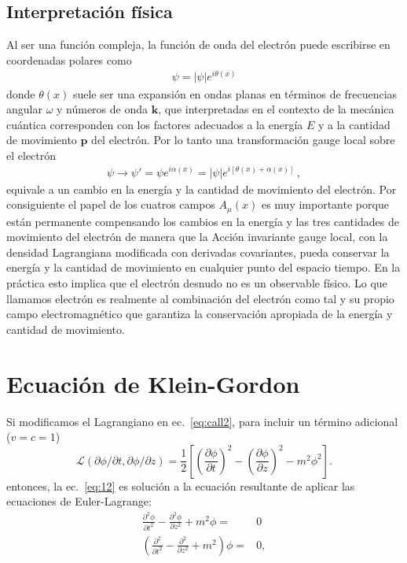 \subsection{Interpretación física}
Al ser una función compleja, la función de onda del electrón puede escribirse en coordenadas polares como
\begin{align}
  \psi=|\psi|e^{i\theta(x)}
\end{align}
donde $\theta(x)$ suele ser una expansión en ondas planas en términos de frecuencias angular $\omega$ y números de onda $\mathbf{k}$, que interpretadas en el contexto de la mecánica cuántica corresponden con los factores adecuados a la energía $E$ y a la cantidad de movimiento $\mathbf{p}$ del electrón. Por lo tanto una transformación gauge local sobre el electrón
\begin{align}
  \psi\to \psi'=\psi e^{i\alpha(x)}=|\psi|e^{i[\theta(x)+\alpha(x)]}\,,
\end{align}
equivale a un cambio en la energía y la cantidad de movimiento del electrón. Por consiguiente el papel de los cuatros campos $A_{\mu}(x)$ es muy importante porque están permanente compensando los cambios en la energía y las tres cantidades de movimiento del electrón de manera que la Acción invariante gauge local, con la densidad Lagrangiana modificada con derivadas covariantes, pueda conservar la energía y la cantidad de movimiento en cualquier punto del espacio tiempo. En la práctica esto implica que el electrón desnudo no es un observable físico. Lo que llamamos electrón es realmente al combinación del electrón como tal y su propio campo electromagnético que garantiza la conservación apropiada de la energía y cantidad de movimiento. 


\section{Ecuación de Klein-Gordon}


Si modificamos el Lagrangiano en ec.~\eqref{eq:call2}, para incluir un
t\'ermino adicional ($v=c=1$)
\begin{equation}
  \label{eq:14}
  \mathcal{L}(\partial\phi/\partial t,\partial\phi/\partial z)=\frac{1}{2}
\left[
  \left(\frac{\partial\phi}{\partial t}\right)^2-\left(\frac{\partial\phi}{\partial z}\right)^2-m^2\phi^2
\right].
\end{equation}
entonces, la ec.~\eqref{eq:12} es soluci\'on a la ecuaci\'on resultante de
aplicar las ecuaciones de Euler-Lagrange:
\begin{align}
\label{eq:150}
      \frac{\partial^2\phi}{\partial t^2}-\frac{\partial^2\phi}{\partial z^2}+m^2\phi=&0\nonumber\\
      \left(\frac{\partial^2}{\partial t^2}-\frac{\partial^2}{\partial z^2}+m^2
      \right)\phi=&0,
\end{align}

